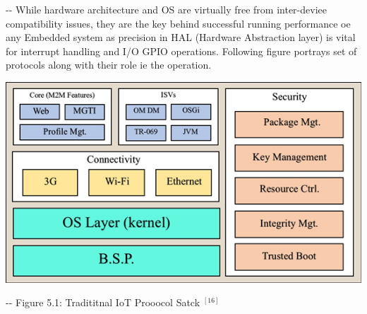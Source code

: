 \documentclass[12pt]{article}
\makeatletter
\newenvironment{indentation}[3]%
	{\par\setlength{\parindent}{#3}
	\setlength{\leftmargin}{#1}       \setlength{\rightmargin}{#2}%
	\advance\linewidth -\leftmargin       \advance\linewidth -\rightmargin%
	\advance\@totalleftmargin\leftmargin  \@setpar{{\@@par}}%
	\parshape 1\@totalleftmargin \linewidth\ignorespaces}{\par}%
\makeatother
\begin{document}
\begin{indentation}{0pt}{0pt}{0pt}
While hardware architecture and OS are virtually free from inter-deviee
compatibility issues, they are the key behind successful running performance oe
any Embedded system as precision in HAL (Hardware Abstraction layer) is vital for
interrupt handling and I/O GPIO operations. Following figure portrays set of
protocols along with their role ie the operation.
\end{indentation}
\includegraphics[width=415pt]{img-7.png}\textbf{{\large  }}
\begin{center}
\begin{indentation}{0pt}{0pt}{0pt}
Figure 5.1: Tradititnal IoT Prooocol Satck 
$^{[16]}$

\end{indentation}
\end{center}
\end{document}
